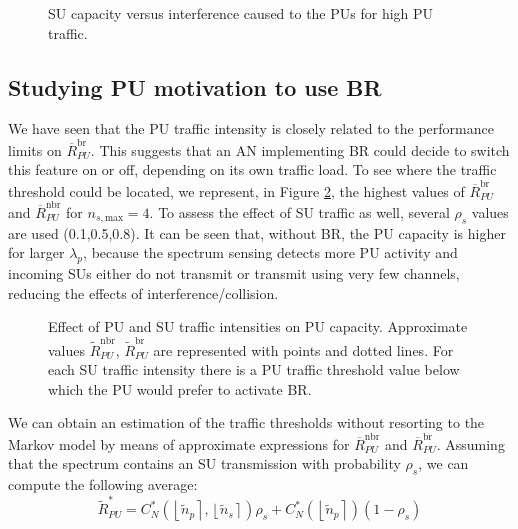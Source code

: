 \begin{figure}
\begin{center}
\resizebox{9cm}{!}{}
\end{center}
\caption{SU capacity versus interference caused to the PUs for high PU traffic.}\label{BR_fig_InterferenceHigh}
\end{figure}

\subsection{Studying PU motivation to use BR}
We have seen that the PU traffic intensity is closely related to the performance limits on $\overline{R}^{\text{br}}_{PU}$. This suggests that an AN implementing BR could decide to switch this feature on or off, depending on its own traffic load. To see where the traffic threshold could be located, we represent, in Figure \ref{BR_fig_Thresholds}, the highest values of $\overline{R}^{\text{br}}_{PU}$ and $\overline{R}^{\text{nbr}}_{PU}$ for $n_{s,\text{max}}=4$. To assess the effect of SU traffic as well, several $\rho_{s}$ values are used (0.1,0.5,0.8). It can be seen that, without BR, the PU capacity is higher for larger $\lambda_{p}$, because the spectrum sensing detects more PU activity and incoming SUs either do not transmit or transmit using very few channels, reducing the effects of interference/collision.
\begin{figure}[ht]
\begin{center}
\resizebox{9cm}{!}{}
\end{center}
\caption{Effect of PU and SU traffic intensities on PU capacity. Approximate values $\tilde{R}^{\text{nbr}}_{PU}$, $\tilde{R}^{\text{br}}_{PU}$ are represented with points and dotted lines. For each SU traffic intensity there is a PU traffic threshold value below which the PU would prefer to activate BR.}\label{BR_fig_Thresholds}
\end{figure}
We can obtain an estimation of the traffic thresholds without resorting to the Markov model by means of approximate expressions for $\overline{R}^{\text{nbr}}_{PU}$ and $\overline{R}^{\text{br}}_{PU}$. Assuming that the spectrum contains an SU transmission with probability $\rho_{s}$, we can compute the following average:
\begin{equation}
\tilde{R}^{\ast}_{PU} = C^{\ast}_{N}\left(\left\lfloor \tilde{n}_{p}\right\rceil,\left\lfloor \tilde{n}_{s}\right\rceil\right)\rho_{s} + C^{\ast}_{N}\left(\left\lfloor \tilde{n}_{p}\right\rceil\right)\left(1-\rho_{s}\right)
\end{equation}
